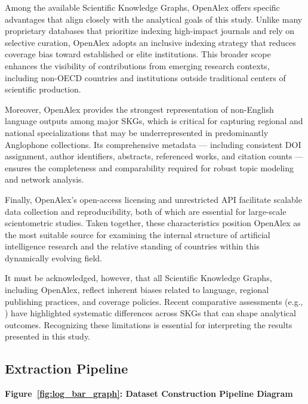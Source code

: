 \documentclass{article}
\begin{document}
Among the available Scientific Knowledge Graphs, OpenAlex offers specific advantages that align closely with the analytical goals of this study. Unlike many proprietary databases that prioritize indexing high-impact journals and rely on selective curation, OpenAlex adopts an inclusive indexing strategy that reduces coverage bias toward established or elite institutions. This broader scope enhances the visibility of contributions from emerging research contexts, including non-OECD countries and institutions outside traditional centers of scientific production.

Moreover, OpenAlex provides the strongest representation of non-English language outputs among major SKGs, which is critical for capturing regional and national specializations that may be underrepresented in predominantly Anglophone collections. Its comprehensive metadata — including consistent DOI assignment, author identifiers, abstracts, referenced works, and citation counts — ensures the completeness and comparability required for robust topic modeling and network analysis.

Finally, OpenAlex’s open-access licensing and unrestricted API facilitate scalable data collection and reproducibility, both of which are essential for large-scale scientometric studies. Taken together, these characteristics position OpenAlex as the most suitable source for examining the internal structure of artificial intelligence research and the relative standing of countries within this dynamically evolving field.

It must be acknowledged, however, that all Scientific Knowledge Graphs, including OpenAlex, reflect inherent biases related to language, regional publishing practices, and coverage policies. Recent comparative assessments (e.g., \cite{REE}) have highlighted systematic differences across SKGs that can shape analytical outcomes. Recognizing these limitations is essential for interpreting the results presented in this study.


\subsection{Extraction Pipeline}


\clearpage
\onecolumn          %
\begin{center}
	{\large\textbf{Figure~\ref{fig:log_bar_graph}: Dataset Construction Pipeline Diagram}}
	\vspace{1em}
\end{center}
\end{document}
